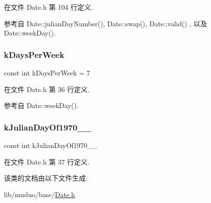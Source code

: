 在文件 Date.\+h 第 104 行定义.



参考自 Date\+::julian\+Day\+Number(), Date\+::swap(), Date\+::valid() , 以及 Date\+::week\+Day().

\mbox{\label{classmuduo_1_1Date_af827c6ba7aa684c3b7b969e412cdaf62}} 
\subsubsection{\texorpdfstring{k\+Days\+Per\+Week}{kDaysPerWeek}}
{\footnotesize\ttfamily const int k\+Days\+Per\+Week = 7\hspace{0.3cm}{\ttfamily [static]}}



在文件 Date.\+h 第 36 行定义.



参考自 Date\+::week\+Day().

\mbox{\label{classmuduo_1_1Date_a49e2c65ade1eb84c87543cb878f5ae13}} 
\subsubsection{\texorpdfstring{k\+Julian\+Day\+Of1970\+\_\+\_}{kJulianDayOf1970\_01\_01}}
{\footnotesize\ttfamily const int k\+Julian\+Day\+Of1970\+\_\+\_\hspace{0.3cm}{\ttfamily [static]}}



在文件 Date.\+h 第 37 行定义.



该类的文档由以下文件生成\+:\begin{DoxyCompactItemize}
\item 
lib/muduo/base/\hyperlink{Date_8h}{Date.\+h}\end{DoxyCompactItemize}
